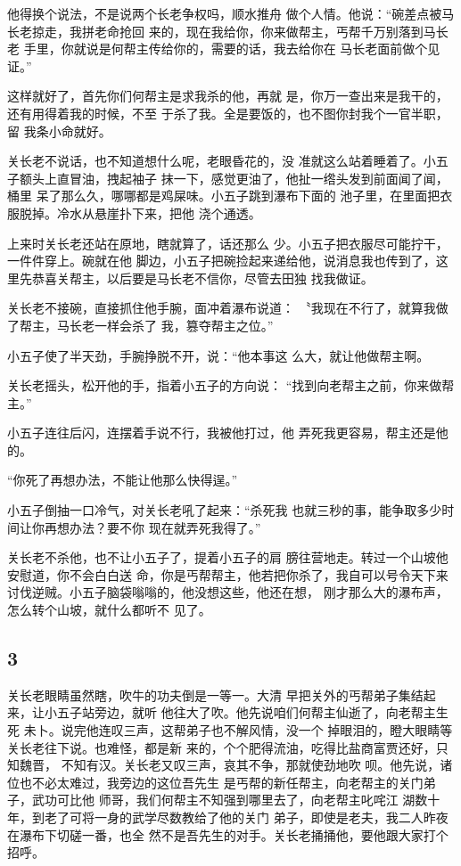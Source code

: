 他得换个说法，不是说两个长老争权吗，顺水推舟
做个人情。他说：“碗差点被马长老掠走，我拼老命抢回
来的，现在我给你，你来做帮主，丐帮千万别落到马长老
手里，你就说是何帮主传给你的，需要的话，我去给你在
马长老面前做个见证。”

这样就好了，首先你们何帮主是求我杀的他，再就
是，你万一查出来是我干的，还有用得着我的时候，不至
于杀了我。全是要饭的，也不图你封我个一官半职，留
我条小命就好。

关长老不说话，也不知道想什么呢，老眼昏花的，没
准就这么站着睡着了。小五子额头上直冒油，拽起袖子
抹一下，感觉更油了，他扯一绺头发到前面闻了闻，桶里
呆了那么久，哪哪都是鸡屎味。小五子跳到瀑布下面的
池子里，在里面把衣服脱掉。冷水从悬崖扑下来，把他
浇个通透。

上来时关长老还站在原地，瞎就算了，话还那么
少。小五子把衣服尽可能拧干，一件件穿上。碗就在他
脚边，小五子把碗捡起来递给他，说消息我也传到了，这
里先恭喜关帮主，以后要是马长老不信你，尽管去田独
找我做证。

关长老不接碗，直接抓住他手腕，面冲着瀑布说道：
〝我现在不行了，就算我做了帮主，马长老一样会杀了
我，篡夺帮主之位。”

小五子使了半天劲，手腕挣脱不开，说：“他本事这
么大，就让他做帮主啊。

关长老摇头，松开他的手，指着小五子的方向说：
“找到向老帮主之前，你来做帮主。”

小五子连往后闪，连摆着手说不行，我被他打过，他
弄死我更容易，帮主还是他的。

“你死了再想办法，不能让他那么快得逞。”

小五子倒抽一口冷气，对关长老吼了起来：“杀死我
也就三秒的事，能争取多少时间让你再想办法？要不你
现在就弄死我得了。”

关长老不杀他，也不让小五子了，提着小五子的肩
膀往营地走。转过一个山坡他安慰道，你不会白白送
命，你是丐帮帮主，他若把你杀了，我自可以号令天下来
讨伐逆贼。小五子脑袋嗡嗡的，他没想这些，他还在想，
刚才那么大的瀑布声，怎么转个山坡，就什么都听不
见了。
\newline

{\centering\subsection{3}}

关长老眼睛虽然瞎，吹牛的功夫倒是一等一。大清
早把关外的丐帮弟子集结起来，让小五子站旁边，就听
他往大了吹。他先说咱们何帮主仙逝了，向老帮主生死
未卜。说完他连叹三声，这帮弟子也不解风情，没一个
掉眼泪的，瞪大眼睛等关长老往下说。也难怪，都是新
来的，个个肥得流油，吃得比盐商富贾还好，只知魏晋，
不知有汉。关长老又叹三声，哀其不争，那就使劲地吹
呗。他先说，诸位也不必太难过，我旁边的这位吾先生
是丐帮的新任帮主，向老帮主的关门弟子，武功可比他
师哥，我们何帮主不知强到哪里去了，向老帮主叱咤江
湖数十年，到老了可将一身的武学尽数教给了他的关门
弟子，即使是老夫，我二人昨夜在瀑布下切磋一番，也全
然不是吾先生的对手。关长老捅捅他，要他跟大家打个
招呼。

